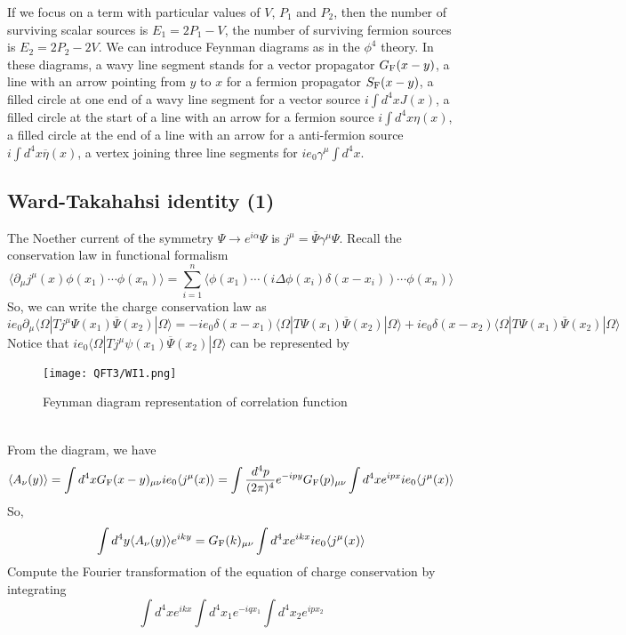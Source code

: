 If we focus on a term with particular values of $V$, $P_1$ and $P_2$, then the number of surviving scalar sources is $E_1 = 2P_1-V$, the number of surviving fermion sources is $E_2 = 2P_2-2V$.
We can introduce Feynman diagrams as in the $\phi^4$ theory. In these diagrams, a wavy line segment stands for a vector propagator $G_{\rm F}(x-y)$, a line with an arrow pointing from $y$ to $x$ for a fermion propagator $S_{\rm F}(x-y)$, a filled circle at one end of a wavy line segment for a vector source $i\int d^4x J(x)$, a filled circle at the start of a line with an arrow for a fermion source $i\int d^4x \eta(x)$, a filled circle at the end of a line with an arrow for a anti-fermion source $i\int d^4x \overline{\eta}(x)$, a vertex joining three line segments for $ie_0\gamma^{\mu}\int d^4x$.

\subsection{Ward-Takahahsi identity (1)}
The Noether current of the symmetry $\Psi \to e^{i\alpha}\Psi$ is $j^{\mu} = \overline{\Psi}\gamma^{\mu}\Psi$. Recall the conservation law in functional formalism
\[\langle \partial_{\mu} j^{\mu}(x) \phi(x_1)\cdots\phi(x_n) \rangle  = \sum_{i=1}^{n} \langle \phi(x_1) \cdots (i\Delta \phi(x_i)\delta(x-x_i)) \cdots \phi(x_n) \rangle\]
So, we can write the charge conservation law as
\[ie_0\partial_{\mu} \langle \Omega | T j^{\mu} \Psi(x_1) \overline{\Psi}(x_2)| \Omega\rangle = -ie_0\delta(x-x_1)\langle \Omega | T \Psi(x_1) \overline{\Psi}(x_2)| \Omega\rangle + ie_0\delta(x-x_2)\langle \Omega | T \Psi(x_1) \overline{\Psi}(x_2)| \Omega\rangle\]
Notice that $ie_0\langle \Omega | T j^{\mu} \psi(x_1) \overline{\Psi}(x_2)| \Omega\rangle$ can be represented by
\begin{figure}[!h]
\centering
\texttt{[image: QFT3/WI1.png]}
\caption{Feynman diagram representation of correlation function}
\end{figure}\\
From the diagram, we have
\[\langle A_{\nu}(y) \rangle = \int d^4x G_{\rm F}(x-y)_{\mu\nu} ie_0\langle j^{\mu}(x) \rangle  = \int \frac{d^4p}{(2\pi)^4} e^{-ipy} G_{\rm F}(p)_{\mu\nu} \int d^4x e^{ipx} ie_0\langle j^{\mu}(x) \rangle\]
So,
\[\int d^4y \langle A_{\nu}(y) \rangle e^{iky} = G_{\rm F}(k)_{\mu\nu} \int d^4x e^{ikx} ie_0\langle j^{\mu}(x)\rangle\]
Compute the Fourier transformation of the equation of charge conservation by integrating
\[\int d^4x e^{ikx} \int d^4x_1 e^{-iqx_1} \int d^4x_2 e^{ipx_2}\]
